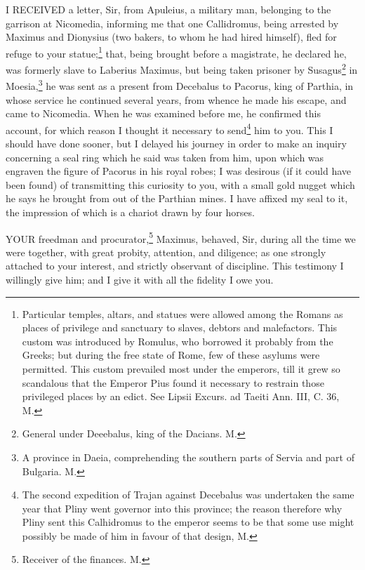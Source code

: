 I RECEIVED a letter, Sir, from Apuleius, a military man, belonging to the
garrison at Nicomedia, informing me that one Callidromus, being arrested
by Maximus and Dionysius (two bakers, to whom he had hired himself), fled
for refuge to your statue;\footnote{Particular temples,
altars, and statues were allowed among the Romans as places of privilege
and sanctuary to slaves, debtors and malefactors. This custom was
introduced by Romulus, who borrowed it probably from the Greeks; but
during the free state of Rome, few of these asylums were permitted. This
custom prevailed most under the emperors, till it grew so scandalous that
the Emperor Pius found it necessary to restrain those privileged places by
an edict. See Lipsii Excurs. ad Taeiti Ann. III, C. 36, M.} that, being brought before a magistrate,
he declared he, was formerly slave to Laberius Maximus, but being taken
prisoner by Susagus\footnote{General under
Deeebalus, king of the Dacians. M.} in Moesia,\footnote{A province in Daeia,
comprehending the southern parts of Servia and part of Bulgaria. M.} he was sent as a
present from Decebalus to Pacorus, king of Parthia, in whose service he
continued several years, from whence he made his escape, and came to
Nicomedia. When he was examined before me, he confirmed this account, for
which reason I thought it necessary to send\footnote{The second expedition
of Trajan against Decebalus was undertaken the same year that Pliny went
governor into this province; the reason therefore why Pliny sent this
Calhidromus to the emperor seems to be that some use might possibly be
made of him in favour of that design, M.} him to you. This
I should have done sooner, but I delayed his journey in order to make an
inquiry concerning a seal ring which he said was taken from him, upon
which was engraven the figure of Pacorus in his royal robes; I was
desirous (if it could have been found) of transmitting this curiosity to
you, with a small gold nugget which he says he brought from out of the
Parthian mines. I have affixed my seal to it, the impression of which is a
chariot drawn by four horses.


YOUR freedman and procurator,\footnote{Receiver of the
finances. M.} Maximus, behaved,
Sir, during all the time we were together, with great probity, attention,
and diligence; as one strongly attached to your interest, and strictly
observant of discipline. This testimony I willingly give him; and I give
it with all the fidelity I owe you.

